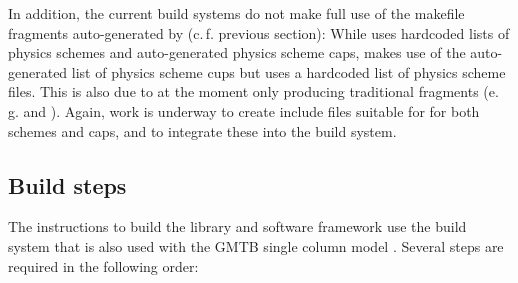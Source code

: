 In addition, the current build systems do not make full use of the makefile fragments auto-generated by  (c.\,f. previous section): While  uses hardcoded lists of physics schemes and auto-generated physics scheme caps,  makes use of the auto-generated list of physics scheme cups but uses a hardcoded list of physics scheme files. This is also due to  at the moment only producing traditional  fragments (e.\,g.  and ). Again, work is underway to create include files suitable for  for both schemes and caps, and to integrate these into the build system.
\subsection{Build steps}\label{sec_ccpp_build_steps}
The instructions to build the library and software framework use the  build system that is also used with the GMTB single column model . Several steps are required in the following order:
